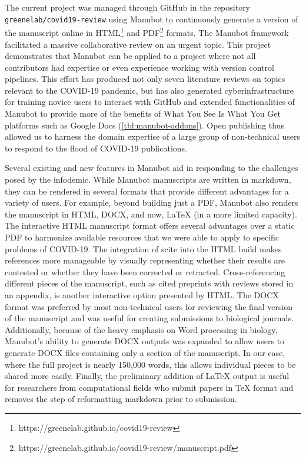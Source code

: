 \documentclass[twocolumn]{ceurart}
\begin{document}
The current project was managed through GitHub in the repository \texttt{greenelab/covid19-review} using Manubot \citep{YuJbg3zO} to continuously generate a version of the manuscript online in HTML\footnote{https://greenelab.github.io/covid19-review} and PDF\footnote{https://greenelab.github.io/covid19-review/manuscript.pdf} formats.
The Manubot framework facilitated a massive collaborative review on an urgent topic.
This project demonstrates that Manubot can be applied to a project where not all contributors had expertise or even experience working with version control pipelines.
This effort has produced not only seven literature reviews on topics relevant to the COVID-19 pandemic, but has also generated cyberinfrastructure for training novice users to interact with GitHub and extended functionalities of Manubot to provide more of the benefits of What You See Is What You Get platforms such as Google Docs (\ref{tbl:manubot-addons}).
Open publishing thus allowed us to harness the domain expertise of a large group of non-technical users to respond to the flood of COVID-19 publications.

Several existing and new features in Manubot aid in responding to the challenges posed by the infodemic.
While Manubot manuscripts are written in markdown, they can be rendered in several formats that provide different advantages for a variety of users.
For example, beyond building just a PDF, Manubot also renders the manuscript in HTML, DOCX, and now, LaTeX (in a more limited capacity).
The interactive HTML manuscript format offers several advantages over a static PDF to harmonize available resources that we were able to apply to specific problems of COVID-19.
The integration of scite into the HTML build makes references more manageable by visually representing whether their results are contested or whether they have been corrected or retracted.
Cross-referencing different pieces of the manuscript, such as cited preprints with reviews stored in an appendix, is another interactive option presented by HTML.
The DOCX format was preferred by most non-technical users for reviewing the final version of the manuscript and was useful for creating submissions to biological journals.
Additionally, because of the heavy emphasis on Word processing in biology, Manubot's ability to generate DOCX outputs was expanded to allow users to generate DOCX files containing only a section of the manuscript.
In our case, where the full project is nearly 150,000 words, this allows individual pieces to be shared more easily.
Finally, the preliminary addition of LaTeX output is useful for researchers from computational fields who submit papers in TeX format and removes the step of reformatting markdown prior to submission.
\end{document}
